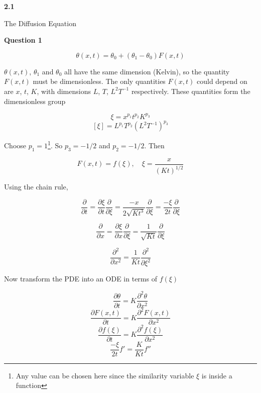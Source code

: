 \documentclass[12pt]{extarticle}
\begin{document}
\begin{flushleft}
\begin{LARGE}
\textbf{2.1}
\end{LARGE}  
\end{flushleft}

\vfill
\begin{center}
\begin{Huge}The Diffusion Equation\end{Huge}
\end{center}
\vfill

\pagebreak

\begin{center}
\textbf{Question 1}
\end{center}

$$\theta(x,t) = \theta_0 +(\theta_1-\theta_0)F(x,t)$$

$\theta(x,t)$, $\theta_1$ and $\theta_0$ all have the same dimension (Kelvin), so the quantity $F(x,t)$ must be dimensionless. The only quantities $F(x,t)$ could depend on are $x$, $t$, $K$, with dimensions $L$, $T$, $L^2T^{-1}$ respectively. These quantities form the dimensionless group 

$$\xi = x^{p_1}t^{p_2}K^{p_3}$$
$$[\xi] = L^{p_1}T^{p_2}(L^2T^{-1})^{p_3}$$

Choose $p_1 = 1$\footnote{Any value can be chosen here since the similarity variable $\xi$ is inside a function}. So $p_3 = -1/2$ and $p_2 = -1/2$. Then 

$$F(x,t) = f(\xi),\quad \xi = \frac{x}{(Kt)^{1/2}}$$

Using the chain rule, 

$$\frac{\partial}{\partial t} = \frac{\partial \xi}{\partial t}\frac{\partial}{\partial \xi} = \frac{-x}{2\sqrt{Kt^3}}\frac{\partial}{\partial \xi} = \frac{-\xi}{2t}\frac{\partial}{\partial \xi}$$

$$\frac{\partial}{\partial x} = \frac{\partial \xi}{\partial x}\frac{\partial}{\partial \xi} = \frac{1}{\sqrt{Kt}}\frac{\partial}{\partial \xi}$$

$$\frac{\partial^2}{\partial x^2} = \frac{1}{Kt}\frac{\partial^2}{\partial \xi^2}$$

Now transform the PDE into an ODE in terms of $f(\xi)$

$$\frac{\partial\theta}{\partial t} = K\frac{\partial^2\theta}{\partial x^2}$$ 
$$\frac{\partial F(x,t)}{\partial t} = K\frac{\partial^2 F(x,t)}{\partial x^2}$$ 
$$\frac{\partial f(\xi)}{\partial t} = K\frac{\partial^2 f(\xi)}{\partial x^2}$$ 
$$\frac{-\xi}{2t}f' = \frac{K}{Kt}f''$$
\end{document}
